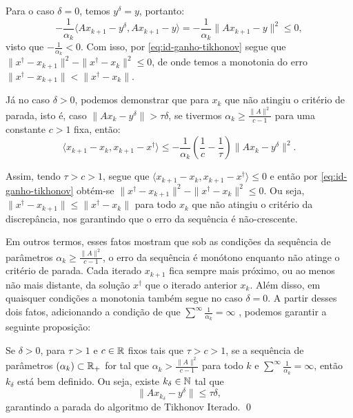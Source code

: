 Para o caso $\delta=0$, temos $y^\delta = y$, portanto:
\begin{equation*}
    - \frac{1}{\alpha_k} \langle Ax_{k+1} - y^\delta, Ax_{k+1} - y \rangle = -\frac{1}{\alpha_k} \| Ax_{k+1} - y\|^2 \leq 0,
\end{equation*}
visto que $-\frac{1}{\alpha_k} < 0$. Com isso, por \eqref{eq:id-ganho-tikhonov} segue que $\|x^\dag - x_{k+1}\|^2 - \|x^\dag - x_{k}\|^2\leq 0$, de onde temos a monotonia do erro $\|x^\dag - x_{k+1}\| < \|x^\dag - x_{k}\|$.

Já no caso $\delta>0$, podemos demonstrar que para $x_{k}$ que não atingiu o critério de parada, isto é, caso $\| Ax_k - y^\delta\| > \tau \delta$, se tivermos $\alpha_k \geq \frac{\|A\|^2}{c-1}$ para uma constante $c>1$ fixa, então:
\begin{equation*}
     \langle x_{k+1} - x_k , x_{k+1} - x^\dag \rangle \leq -\frac{1}{\alpha_k} \left( \frac{1}{c} - \frac{1}{\tau} \right) \| Ax_k - y^\delta \|^2.
\end{equation*}

Assim, tendo $\tau>c>1$, segue que $\langle x_{k+1} - x_k , x_{k+1} - x^\dag \rangle \leq 0$ e então por \eqref{eq:id-ganho-tikhonov} obtém-se $ \| x^\dag - x_{k+1}\|^2 - \| x^\dag - x_{k}\|^2 \leq 0$. Ou seja, $ \| x^\dag - x_{k+1}\| \leq \| x^\dag - x_{k}\|$ para todo $x_k$ que não atingiu o critério da discrepância, nos garantindo que o erro da sequência é não-crescente.

Em outros termos, esses fatos mostram que sob as condições da sequência de parâmetros $\alpha_k \geq \frac{\|A\|^2}{c-1}$, o erro da sequência é monótono enquanto não atinge o critério de parada. Cada iterado $x_{k+1}$ fica sempre mais próximo, ou ao menos não mais distante, da solução $x^\dag$ que o iterado anterior $x_k$. Além disso, em quaisquer condições a monotonia também segue no caso $\delta=0$. A partir desses dois fatos, adicionando a condição de que $\sum^\infty \frac{1}{\alpha_k}=\infty$ , podemos garantir a seguinte proposição:

\begin{prop}
    Se $\delta>0$, para $\tau>1$ e $c\in \mathbb{R}$ fixos tais que $\tau>c>1$, se a sequência de parâmetros $(\alpha_k) \subset \mathbb{R}_+$ for tal que $\alpha_k> \frac{\| A \|^2}{c-1}$ para todo $k$ e $\sum^\infty \frac{1}{\alpha_k}=\infty$, então $k_\delta$ está bem definido. Ou seja, existe $k_\delta\in \mathbb N$ tal que
    \begin{equation*}
        \| Ax_{k_\delta} - y^\delta \| \leq \tau \delta, 
    \end{equation*}
    garantindo a parada do algoritmo de Tikhonov Iterado.   \qed
\end{prop}

